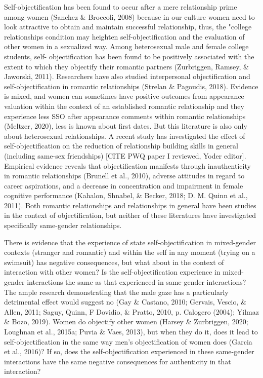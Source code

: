 \documentclass[
  man]{apa6}
\begin{document}
Self-objectification has been found to occur after a mere relationship prime among women (Sanchez \& Broccoli, 2008) because in our culture women need to look attractive to obtain and maintain successful relationship, thus, the "college relationships condition may heighten self-objectification and the evaluation of other women in a sexualized way. Among heterosexual male and female college students, self- objectification has been found to be positively associated with the extent to which they objectify their romantic partners (Zurbriggen, Ramsey, \& Jaworski, 2011). Researchers have also studied interpersonal objectification and self-objectification in romantic relationships (Strelan \& Pagoudis, 2018). Evidence is mixed, and women can sometimes have positive outcomes from appearance valuation within the context of an established romantic relationship and they experience less SSO after appearance comments within romantic relationships (Meltzer, 2020), less is known about first dates. But this literature is also only about heterosexual relationships. A recent study has investigated the effect of self-objectification on the reduction of relationship building skills in general (including same-sex friendships) {[}CITE PWQ paper I reviewed, Yoder editor{]}. Empirical evidence reveals that objectification manifests through inauthenticity in romantic relationships (Brunell et al., 2010), adverse attitudes in regard to career aspirations, and a decrease in concentration and impairment in female cognitive performance (Kahalon, Shnabel, \& Becker, 2018; D. M. Quinn et al., 2011). Both romantic relationships and relationships in general have been studies in the context of objectification, but neither of these literatures have investigated specifically same-gender relationships.

There is evidence that the experience of state self-objectification in mixed-gender contexts (stranger and romantic) and within the self in any moment (trying on a swimsuit) has negative consequences, but what about in the context of interaction with other women? Is the self-objectification experience in mixed-gender interactions the same as that experienced in same-gender interactions? The ample research demonstrating that the male gaze has a particularly detrimental effect would suggest no (Gay \& Castano, 2010; Gervais, Vescio, \& Allen, 2011; Saguy, Quinn, F Dovidio, \& Pratto, 2010, p. Calogero (2004); Yilmaz \& Bozo, 2019). Women do objectify other women (Harsey \& Zurbriggen, 2020; Loughnan et al., 2015a; Puvia \& Vaes, 2013), but when they do it, does it lead to self-objectification in the same way men's objectification of women does (Garcia et al., 2016)? If so, does the self-objectification experienced in these same-gender interactions have the same negative consequences for authenticity in that interaction?
\end{document}

